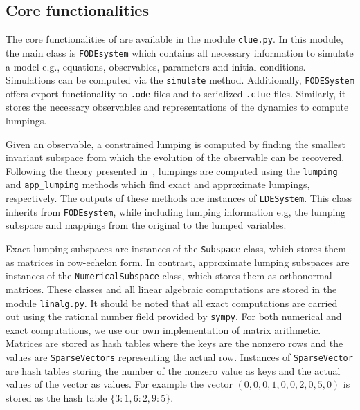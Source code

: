 
\subsection{Core functionalities}
The core functionalities of \ToolName are available in the module \texttt{clue.py}.
In this module, the main class is \texttt{FODEsystem} which contains all necessary information to simulate a model e.g., equations, observables, parameters and initial conditions. 
Simulations can be computed via the \texttt{simulate} method.
Additionally, \texttt{FODESystem} offers export functionality to \texttt{.ode} files and to serialized \texttt{.clue} files.
Similarly, it stores the necessary observables and representations of the dynamics to compute lumpings. 

Given an observable, a constrained lumping is computed by finding the smallest invariant subspace from which the evolution of the observable can be recovered. 
Following the  theory presented in~\cite{leguizamon-robayo_approximate_2023, jimenez_clue_2022}, lumpings are computed using the \texttt{lumping} and \texttt{app\_lumping} methods which find exact and approximate lumpings, respectively. 
The outputs of these methods are instances of \texttt{LDESystem}. 
This class inherits from \texttt{FODEsystem}, while including lumping information e.g, the lumping subspace and mappings from the original to the lumped variables.

Exact lumping subspaces are instances of the \texttt{Subspace} class, which stores them as matrices in row-echelon form.
In contrast, approximate lumping subspaces are instances of the \texttt{NumericalSubspace} class, which stores them as orthonormal matrices.
These classes and all linear algebraic computations are stored in the module \texttt{linalg.py}.
It should be noted that all exact computations are carried out using the rational number field provided by \texttt{sympy}.
For both numerical and exact computations, we use our own implementation of matrix arithmetic.
Matrices are stored as hash tables where the keys are the nonzero rows and the values are \texttt{SparseVectors} representing the actual row.
Instances of \texttt{SparseVector}  are hash tables storing  the number of the nonzero value as keys and  the actual values of the vector as values.
For example the vector $(0,0,0,1,0,0,2,0,5,0)$ is stored as the hash table $\{ 3:1, 6:2, 9:5\}$.

